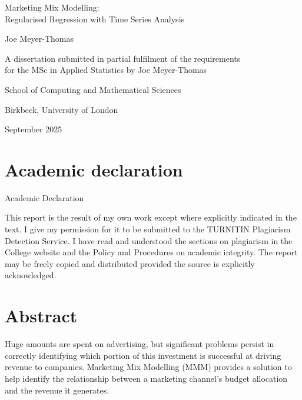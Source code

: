 \documentclass[11pt, a4paper]{article}
\begin{document}
\begin{titlepage}
\centering
\vspace*{2cm}

{\LARGE Marketing Mix Modelling: \\Regularised Regression with Time Series Analysis}

\vspace{1cm}

Joe Meyer-Thomas

\vfill

A dissertation submitted in partial fulfilment of the requirements\\
for the MSc in Applied Statistics by Joe Meyer-Thomas

\vspace{2cm}

School of Computing and Mathematical Sciences

\vspace{1cm}

Birkbeck, University of London

\vspace{1cm}

September 2025

\end{titlepage}


\newpage

\section*{Academic declaration}
{Academic Declaration}

This report is the result of my own work except where explicitly indicated in the text. I give my permission for it to be submitted to the TURNITIN Plagiarism Detection Service. I have read and understood the sections on plagiarism in the College website and the Policy and Procedures on academic integrity. The report may be freely copied and distributed provided the source is explicitly acknowledged.

\newpage

\section*{Abstract}


Huge amounts are spent on advertising, but significant problems persist in correctly identifying which portion of this investment is successful at driving revenue to companies. Marketing Mix Modelling (MMM) provides a solution to help identify the relationship between a marketing channel’s budget allocation and the revenue it generates. 
\end{document}
